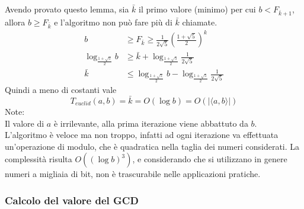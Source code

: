 Avendo provato questo lemma, sia $
\bar{k}
$ il primo valore (minimo) per cui $
b < F_{
    \bar{k} + 1
}
$, allora $
b \geq F_{
    \bar{k}
}
$ e l'algoritmo non può fare più di $
\bar{k}
$ chiamate.
\begin{align*}
    b
    &
    \geq F_{
        \bar{k}
    }
    \geq
    \frac{1}{
        2 \sqrt{5}
    }
    \left( 
        \frac{1 + \sqrt{5} }{2}
    \right)^{k}
    \\
    \log_{ \frac{1 + \sqrt{5} }{2} }
    b
    &
    \geq
    \bar{k}
    +
    \log_{ \frac{1 + \sqrt{5} }{2} }
    \frac{1}{ 2 \sqrt{5} }
    \\
    \bar{k}
    &
    \leq
    \log_{ \frac{1 + \sqrt{5} }{2} }
    b
    -
    \log_{ \frac{1 + \sqrt{5} }{2} }
    \frac{1}{ 2 \sqrt{5} }
\end{align*}
Quindi a meno di costanti vale
\begin{equation*}
    T_{euclid} \left( a, b \right)
    =
    \bar{k}
    =
    O \left( \log b \right)
    =
    O \left( |
        \langle
            a, b
        \rangle 
    | \right)
\end{equation*}
Note:
\\
Il valore di $a$ è irrilevante, alla prima iterazione viene abbattuto da $b$.
\\
L'algoritmo è veloce ma non troppo, infatti ad ogni iterazione va effettuata un'operazione di modulo, che è quadratica nella taglia dei numeri considerati.
La complessità risulta
$
O
( ( \log b )^3 )
$, e considerando che si utilizzano in genere numeri a migliaia di bit, non è trascurabile nelle applicazioni pratiche.

\subsubsection{Calcolo del valore del GCD}

